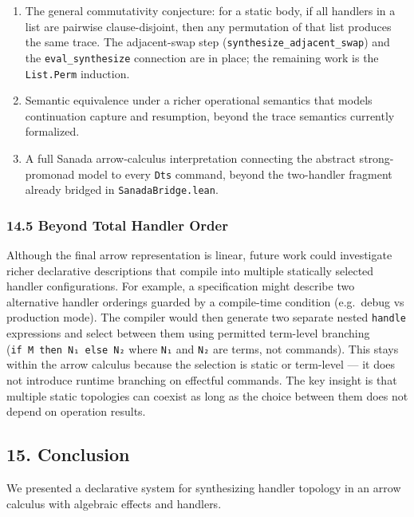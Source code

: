 \documentclass[
  11pt,
]{article}
\providecommand{\tightlist}{%
  \setlength{\itemsep}{0pt}\setlength{\parskip}{0pt}}
\begin{document}
\begin{enumerate}
\def\labelenumi{\arabic{enumi}.}
\tightlist
\item
  The general commutativity conjecture: for a static body, if all
  handlers in a list are pairwise clause-disjoint, then any permutation
  of that list produces the same trace. The adjacent-swap step
  (\texttt{synthesize\_adjacent\_swap}) and the
  \texttt{eval\_synthesize} connection are in place; the remaining work
  is the \texttt{List.Perm} induction.
\item
  Semantic equivalence under a richer operational semantics that models
  continuation capture and resumption, beyond the trace semantics
  currently formalized.
\item
  A full Sanada arrow-calculus interpretation connecting the abstract
  strong-promonad model to every \texttt{Dts} command, beyond the
  two-handler fragment already bridged in \texttt{SanadaBridge.lean}.
\end{enumerate}

\subsubsection{14.5 Beyond Total Handler
Order}\label{beyond-total-handler-order}

Although the final arrow representation is linear, future work could
investigate richer declarative descriptions that compile into multiple
statically selected handler configurations. For example, a specification
might describe two alternative handler orderings guarded by a
compile-time condition (e.g.~debug vs production mode). The compiler
would then generate two separate nested \texttt{handle} expressions and
select between them using permitted term-level branching
(\texttt{if\ M\ then\ N₁\ else\ N₂} where \texttt{N₁} and \texttt{N₂}
are terms, not commands). This stays within the arrow calculus because
the selection is static or term-level --- it does not introduce runtime
branching on effectful commands. The key insight is that multiple static
topologies can coexist as long as the choice between them does not
depend on operation results.

\subsection{15. Conclusion}\label{conclusion}

We presented a declarative system for synthesizing handler topology in
an arrow calculus with algebraic effects and handlers.
\end{document}
